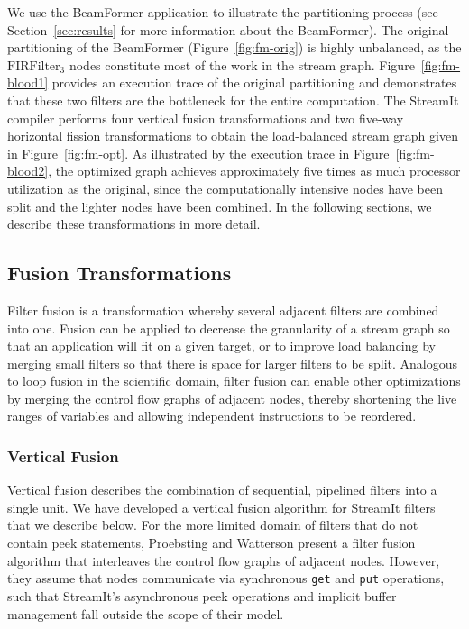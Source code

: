 We use the BeamFormer application \cite{pca} to illustrate the
partitioning process (see Section~\ref{sec:results} for more
information about the BeamFormer).  The original partitioning of the
BeamFormer (Figure~\ref{fig:fm-orig}) is highly unbalanced, as the
$\mbox{FIRFilter}_3$ nodes constitute most of the work in the stream
graph.  Figure~\ref{fig:fm-blood1} provides an execution trace of the
original partitioning and demonstrates that these two filters are the
bottleneck for the entire computation.  The StreamIt compiler performs
four vertical fusion transformations and two five-way horizontal
fission transformations to obtain the load-balanced stream graph given
in Figure~\ref{fig:fm-opt}.  As illustrated by the execution trace in
Figure~\ref{fig:fm-blood2}, the optimized graph achieves approximately
five times as much processor utilization as the original, since the
computationally intensive nodes have been split and the lighter nodes
have been combined. In the following sections, we describe these
transformations in more detail.

\subsection{Fusion Transformations}

Filter fusion is a transformation whereby several adjacent filters are
combined into one.  Fusion can be applied to decrease the granularity
of a stream graph so that an application will fit on a given target,
or to improve load balancing by merging small filters so that there is
space for larger filters to be split.  Analogous to loop fusion in the
scientific domain, filter fusion can enable other optimizations by
merging the control flow graphs of adjacent nodes, thereby shortening
the live ranges of variables and allowing independent instructions to
be reordered.

\subsubsection{Vertical Fusion}

Vertical fusion describes the combination of sequential, pipelined
filters into a single unit.  We have developed a vertical fusion
algorithm for StreamIt filters that we describe below.  For the more
limited domain of filters that do not contain peek statements,
Proebsting and Watterson \cite{pro96} present a filter fusion
algorithm that interleaves the control flow graphs of adjacent nodes.
However, they assume that nodes communicate via synchronous {\tt get}
and {\tt put} operations, such that StreamIt's asynchronous peek
operations and implicit buffer management fall outside the scope of
their model.

